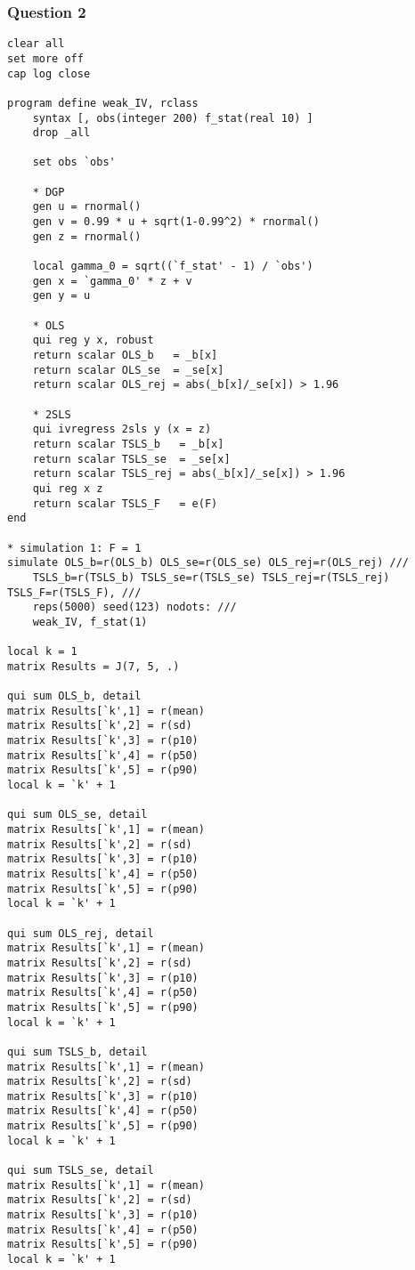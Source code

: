 \documentclass[12pt]{article}
\begin{document}
\subsubsection{Question 2}
\begin{verbatim}
clear all
set more off
cap log close

program define weak_IV, rclass
    syntax [, obs(integer 200) f_stat(real 10) ]
	drop _all
	
	set obs `obs'
	
	* DGP
	gen u = rnormal()
	gen v = 0.99 * u + sqrt(1-0.99^2) * rnormal()
	gen z = rnormal()
	
	local gamma_0 = sqrt((`f_stat' - 1) / `obs')
	gen x = `gamma_0' * z + v
	gen y = u
	
	* OLS
	qui reg y x, robust
	return scalar OLS_b   = _b[x]
	return scalar OLS_se  = _se[x]
	return scalar OLS_rej = abs(_b[x]/_se[x]) > 1.96
	
	* 2SLS
	qui ivregress 2sls y (x = z)
	return scalar TSLS_b   = _b[x]
	return scalar TSLS_se  = _se[x]
	return scalar TSLS_rej = abs(_b[x]/_se[x]) > 1.96
	qui reg x z
	return scalar TSLS_F   = e(F)
end

* simulation 1: F = 1 
simulate OLS_b=r(OLS_b) OLS_se=r(OLS_se) OLS_rej=r(OLS_rej) ///
    TSLS_b=r(TSLS_b) TSLS_se=r(TSLS_se) TSLS_rej=r(TSLS_rej) TSLS_F=r(TSLS_F), ///
    reps(5000) seed(123) nodots: ///
    weak_IV, f_stat(1)
	
local k = 1
matrix Results = J(7, 5, .)

qui sum OLS_b, detail
matrix Results[`k',1] = r(mean)
matrix Results[`k',2] = r(sd)
matrix Results[`k',3] = r(p10)
matrix Results[`k',4] = r(p50)
matrix Results[`k',5] = r(p90)
local k = `k' + 1

qui sum OLS_se, detail
matrix Results[`k',1] = r(mean)
matrix Results[`k',2] = r(sd)
matrix Results[`k',3] = r(p10)
matrix Results[`k',4] = r(p50)
matrix Results[`k',5] = r(p90)
local k = `k' + 1

qui sum OLS_rej, detail
matrix Results[`k',1] = r(mean)
matrix Results[`k',2] = r(sd)
matrix Results[`k',3] = r(p10)
matrix Results[`k',4] = r(p50)
matrix Results[`k',5] = r(p90)
local k = `k' + 1

qui sum TSLS_b, detail
matrix Results[`k',1] = r(mean)
matrix Results[`k',2] = r(sd)
matrix Results[`k',3] = r(p10)
matrix Results[`k',4] = r(p50)
matrix Results[`k',5] = r(p90)
local k = `k' + 1

qui sum TSLS_se, detail
matrix Results[`k',1] = r(mean)
matrix Results[`k',2] = r(sd)
matrix Results[`k',3] = r(p10)
matrix Results[`k',4] = r(p50)
matrix Results[`k',5] = r(p90)
local k = `k' + 1


\end{verbatim}
\end{document}
